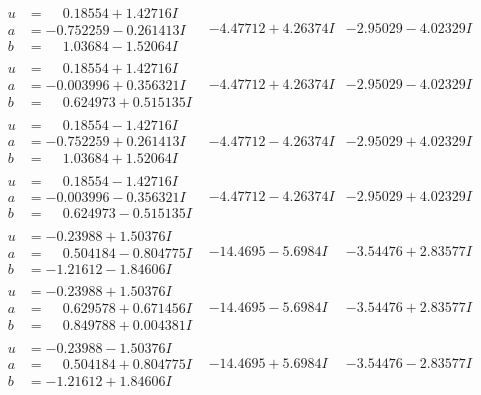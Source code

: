 \documentclass[1p]{elsarticle_modified}
\theoremstyle{definition}
\begin{document}
$$\begin{array}{c|c|c}
\begin{aligned}
u &= \phantom{-}0.18554 + 1.42716 I \\
a &= -0.752259 - 0.261413 I \\
b &= \phantom{-}1.03684 - 1.52064 I\end{aligned}
 & -4.47712 + 4.26374 I & -2.95029 - 4.02329 I \\ \hline\begin{aligned}
u &= \phantom{-}0.18554 + 1.42716 I \\
a &= -0.003996 + 0.356321 I \\
b &= \phantom{-}0.624973 + 0.515135 I\end{aligned}
 & -4.47712 + 4.26374 I & -2.95029 - 4.02329 I \\ \hline\begin{aligned}
u &= \phantom{-}0.18554 - 1.42716 I \\
a &= -0.752259 + 0.261413 I \\
b &= \phantom{-}1.03684 + 1.52064 I\end{aligned}
 & -4.47712 - 4.26374 I & -2.95029 + 4.02329 I \\ \hline\begin{aligned}
u &= \phantom{-}0.18554 - 1.42716 I \\
a &= -0.003996 - 0.356321 I \\
b &= \phantom{-}0.624973 - 0.515135 I\end{aligned}
 & -4.47712 - 4.26374 I & -2.95029 + 4.02329 I \\ \hline\begin{aligned}
u &= -0.23988 + 1.50376 I \\
a &= \phantom{-}0.504184 - 0.804775 I \\
b &= -1.21612 - 1.84606 I\end{aligned}
 & -14.4695 - 5.6984 I & -3.54476 + 2.83577 I \\ \hline\begin{aligned}
u &= -0.23988 + 1.50376 I \\
a &= \phantom{-}0.629578 + 0.671456 I \\
b &= \phantom{-}0.849788 + 0.004381 I\end{aligned}
 & -14.4695 - 5.6984 I & -3.54476 + 2.83577 I \\ \hline\begin{aligned}
u &= -0.23988 - 1.50376 I \\
a &= \phantom{-}0.504184 + 0.804775 I \\
b &= -1.21612 + 1.84606 I\end{aligned}
 & -14.4695 + 5.6984 I & -3.54476 - 2.83577 I \\ \hline\begin{aligned}

\end{aligned}
\end{array}$$
\end{document}
